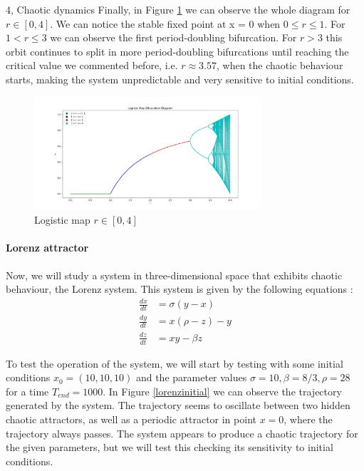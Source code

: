 \begin{task}{4, Chaotic dynamics}
Finally, in Figure \ref{r04} we can observe the whole diagram for \(r \in [0,4]\). We can notice the stable fixed point at x = 0 when \(0 \le r \le 1\). For \(1 < r \le 3\) we can observe the first period-doubling bifurcation. For \(r > 3\) this orbit continues to split in more period-doubling bifurcations until reaching the critical value we commented before, i.e. \(r \approx 3.57\), when the chaotic behaviour starts, making the system unpredictable and very sensitive to initial conditions.
\begin{figure}[H]
    \centering
    \includegraphics[width=0.75\textwidth]{images/logistic_map_0_4.png}
    \caption{Logistic map \(r \in [0,4]\)}
    \label{r04}
\end{figure}

\paragraph{Lorenz attractor} Now, we will study a system in three-dimensional space that exhibits chaotic behaviour, the Lorenz system.
This system is given by the following equations \cite{lorenz1963deterministic}:
\begin{align*}
\frac{dx}{dt} &= \sigma (y - x) \\
\frac{dy}{dt} &= x (\rho - z) - y \\
\frac{dz}{dt} &= xy - \beta z
\end{align*}

To test the operation of the system, we will start by testing with some initial conditions \(x_0 = (10,10,10)\) and the parameter values \(\sigma = 10, \beta = 8/3, \rho = 28\) for a time \(T_{end} = 1000\). In Figure \ref{lorenzinitial} we can observe the trajectory generated by the system. The trajectory seems to oscillate between two hidden chaotic attractors, as well as a periodic attractor in point \(x = 0\), where the trajectory always passes. The system appears to produce a chaotic trajectory for the given parameters, but we will test this checking its sensitivity to initial conditions.


\end{task}
